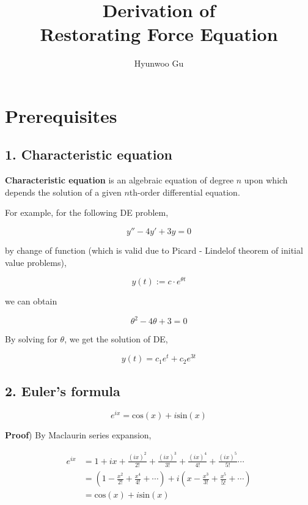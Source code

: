 \documentclass[12pt]{article}
\begin{document}
\title{\textbf{Derivation of \\ Restorating Force Equation}}
\author{Hyunwoo Gu}
\date{}

\maketitle

\section*{Prerequisites}

\subsection*{1. Characteristic equation}

\textbf{Characteristic equation} is an algebraic equation of degree $n$ upon which depends the solution of a given $n$th-order differential equation. 

For example, for the following DE problem,

$$
y'' - 4y' + 3y = 0
$$

by change of function (which is valid due to Picard - Lindelof theorem of initial value problems),

$$
y(t) := c \cdot e^{\theta t}
$$

we can obtain

$$
\theta^2 - 4\theta + 3 = 0
$$

By solving for $\theta$, we get the solution of DE,

$$
y(t) = c_1 e^t + c_2 e^{3t}
$$

\pagebreak
\subsection*{2. Euler's formula}

$$
e^{ix} = \mathrm{cos}(x) + i \mathrm{sin}(x)
$$

\textbf{Proof}) By Maclaurin series expansion, 

$$
\begin{aligned}
e^{ix} &= 1 + ix + \frac{(ix)^2}{2!} + \frac{(ix)^3}{3!} + \frac{(ix)^4}{4!} + \frac{(ix)^5}{5!} \cdots \\[10pt]
&= \left( 1 - \frac{x^2}{2!} + \frac{x^4}{4!} + \cdots \right) + i\left(  x - \frac{x^3}{3!} + \frac{x^5}{5!}  + \cdots \right) \\[10pt]
&= \mathrm{cos}(x) + i \mathrm{sin}(x)
\end{aligned}
$$
\end{document}
